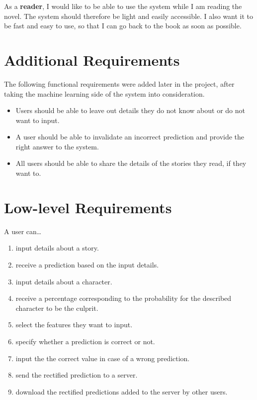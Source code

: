 \documentclass{mproj}
\begin{document}
As a \textbf{reader}, I would like to be able to use the system while I am reading the novel. The system should therefore be light and easily accessible. I also want it to be fast and easy to use, so that I can go back to the book as soon as possible. 

\section{Additional Requirements}
	
The following functional requirements were added later in the project, after taking the machine learning side of the system into consideration.
\begin{itemize}[topsep=0pt]
\item Users should be able to leave out details they do not know about or do not want to input.
\item A user should be able to invalidate an incorrect prediction and provide the right answer to the system. 
\item All users should be able to share the details of the stories they read, if they want to.
\end{itemize}

\section{Low-level Requirements}\label{requirements}
	
A user can\ldots
\begin{enumerate}[topsep=0pt]\label{user_stories}
	\item input details about a story.
	\item receive a prediction based on the input details.
	\item input details about a character.
	\item receive a percentage corresponding to the probability for the described character to be the culprit.
	\item select the features they want to input.
	\item specify whether a prediction is correct or not.
	\item input the the correct value in case of a wrong prediction.
	\item send the rectified prediction to a server.
	\item download the rectified predictions added to the server by other users. \\\\
\end{enumerate}
\end{document}
